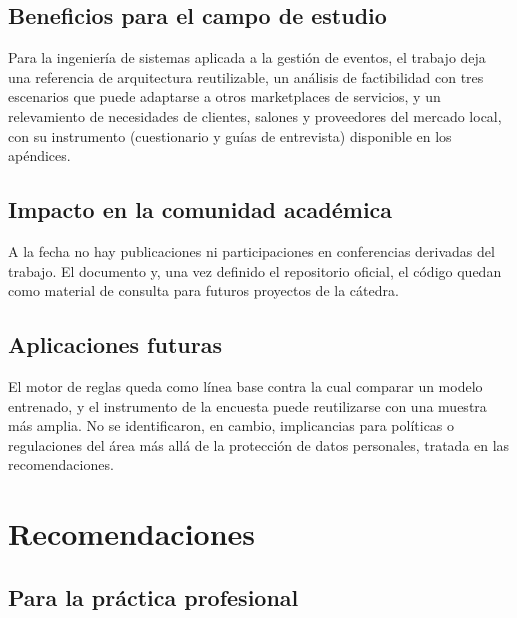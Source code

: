 \subsection{Beneficios para el campo de estudio}

Para la ingeniería de sistemas aplicada a la gestión de eventos, el
trabajo deja una referencia de arquitectura reutilizable, un análisis de
factibilidad con tres escenarios que puede adaptarse a otros marketplaces
de servicios, y un relevamiento de necesidades de clientes, salones y
proveedores del mercado local, con su instrumento (cuestionario y guías de
entrevista) disponible en los apéndices.

\subsection{Impacto en la comunidad académica}

A la fecha no hay publicaciones ni participaciones en conferencias
derivadas del trabajo. El documento y, una vez definido el repositorio
oficial, el código quedan como material de consulta para futuros
proyectos de la cátedra.

\subsection{Aplicaciones futuras}

El motor de reglas queda como línea base contra la cual comparar un modelo
entrenado, y el instrumento de la encuesta puede reutilizarse con una
muestra más amplia. No se identificaron, en cambio, implicancias para
políticas o regulaciones del área más allá de la protección de datos
personales, tratada en las recomendaciones.

\section{Recomendaciones}

\subsection{Para la práctica profesional}

